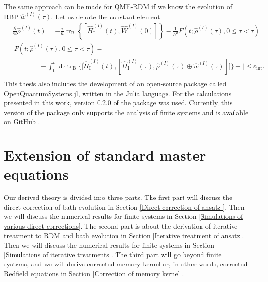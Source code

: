 The same approach can be made for QME-RDM if we know the evolution of RBP $\hat{w}^{(I)}(\tau)$. Let us denote the constant element
\begin{equation}
    \begin{aligned}
    &\frac{\partial}{\partial t} \hat{\rho}^{(I)}(t) = -\frac{i}{\hbar}\operatorname{tr}_{\mathrm{B}}\left\{\left[\hat{H}_{\mathrm{I}}^{(I)}(t), \hat{W}^{(I)}(0)\right]\right\} -\frac{1}{\hbar^{2}}  F\left(t; \hat{\rho}^{(I)}(\tau), 0 \leq \tau < \tau\right)\\
    &\Big|F\left(t; \hat{\rho}^{(I)}(\tau), 0 \leq \tau < \tau\right) -   \\
    & \quad \quad  \quad \quad -\int_{0}^{t} \mathrm{~d} \tau\operatorname{tr}_{\mathrm{B}}\Big\{\Big[\hat{H}_{\mathrm{I}}^{(I)}(t), \left[\hat{H}_{\mathrm{I}}^{(I)}(\tau), \hat{\rho}^{(I)}(\tau) \oplus \hat{w}^{(I)}(\tau)\right]\Big]\Big\}-  \Big| \leq \varepsilon_\text{int}.\\
    \end{aligned}
\end{equation}
This thesis also includes the development of an open-source package called OpenQuantumSystems.jl, written in the Julia language. For the calculations presented in this work, version 0.2.0 of the package was used. Currently, this version of the package only supports the analysis of finite systems and is available on GitHub \cite{OpenQuantumSystems}.

\chapter{Extension of standard master equations}
Our derived theory is divided into three parts. The first part will discuss the direct correction of bath evolution in Section \ref{Direct correction of ansatz }. Then we will discuss the numerical results for finite systems in Section \ref{Simulations of various direct corrections}. The second part is about the derivation of iterative treatment to RDM and bath evolution in Section \ref{Iterative treatment of ansatz}. Then we will discuss the numerical results for finite systems in Section \ref{Simulations of iterative treatments}. The third part will go beyond finite systems, and we will derive corrected memory kernel or, in other words, corrected Redfield equations in Section \ref{Correction of memory kernel}.
